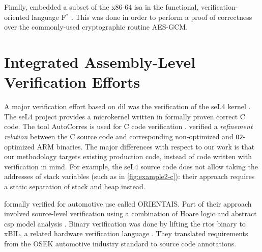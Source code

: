 Finally, \textcite{fromherz2019verified} embedded a subset
of the x86-64 \ac{isa} in the functional, verification-oriented language
F$^*$ \autocite{fstar}.
This was done in order to perform a proof of correctness
over the commonly-used cryptographic routine AES-GCM.

\section{Integrated Assembly-Level Verification Efforts}\label{se:integrated_assembly}
A major verification effort based on \acl{dil}
was the verification of the seL4 kernel \autocite{klein2009sel4,Klein_AEMSKH_14}.
The seL4 project provides a microkernel written in formally proven correct C code.
The tool AutoCorres is used for C code verification \autocite{greenaway2012bridging}.
\textcite{sewell2013tvv} verified a \emph{refinement relation} between the C source code
and corresponding non-optimized and \lstinline|O2|-optimized ARM binaries.
The major differences with respect to our work
is that our methodology targets existing production code,
instead of code written with verification in mind.
For example, the seL4 source code does not allow taking the addresses of stack variables
(such as in \cref{fig:example2-c}):
their approach requires a static separation of stack and heap instead.

\textcite{shi2012orientais} formally verified  for automotive use
called ORIENTAIS.
Part of their approach involved source-level verification
using a combination of Hoare logic
and abstract \ac{csp} model analysis \autocite{hoare1978csp}.
Binary verification was done by lifting the \ac{rtos} binary to xBIL,
a related hardware verification language \autocite{shi2012xbil}.
They translated requirements from the OSEK automotive industry standard
to source code annotations.

